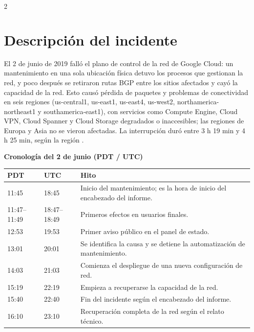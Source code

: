 \documentclass[10pt]{article}
\begin{document}
\begin{multicols}{2}
\raggedcolumns
\section{Descripción del incidente}

El 2 de junio de 2019 falló el plano de control de la red de Google Cloud: un mantenimiento en una sola ubicación física detuvo los procesos que gestionan la red, y poco después se retiraron rutas BGP entre los sitios afectados y cayó la capacidad de la red. Esto causó pérdida de paquetes y problemas de conectividad en seis regiones (us-central1, us-east1, us-east4, us-west2, northamerica-northeast1 y southamerica-east1), con servicios como Compute Engine, Cloud VPN, Cloud Spanner y Cloud Storage degradados o inaccesibles; las regiones de Europa y Asia no se vieron afectadas. La interrupción duró entre 3 h 19 min y 4 h 25 min, según la región \cite{googlecloud19009}.

\medskip\noindent\textbf{Cronología del 2 de junio (PDT / UTC)} \cite{googlecloud19009}\par
\noindent\begin{tabularx}{\linewidth}{|l|l|@{\hspace{3pt}}X|}\hline PDT & UTC & Hito \\ \hline
11:45 & 18:45 & Inicio del mantenimiento; es la hora de inicio del encabezado del informe. \\ \hline
11:47--11:49 & 18:47--18:49 & Primeros efectos en usuarios finales. \\ \hline
12:53 & 19:53 & Primer aviso público en el panel de estado. \\ \hline
13:01 & 20:01 & Se identifica la causa y se detiene la automatización de mantenimiento. \\ \hline
14:03 & 21:03 & Comienza el despliegue de una nueva configuración de red. \\ \hline
15:19 & 22:19 & Empieza a recuperarse la capacidad de la red. \\ \hline
15:40 & 22:40 & Fin del incidente según el encabezado del informe. \\ \hline
16:10 & 23:10 & Recuperación completa de la red según el relato técnico. \\ \hline
\end{tabularx}\par




\end{multicols}
\end{document}
